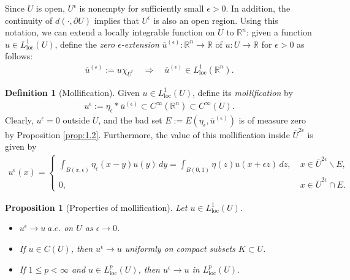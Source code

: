 \documentclass{article}
\numberwithin{equation}{section}
\newcommand{\bbR}{\mathbb{R}}
\newcommand{\loc}{\mathrm{loc}}
\theoremstyle{plain}
\newtheorem{proposition}[theorem]{Proposition}
\theoremstyle{definition}
\newtheorem{definition}[theorem]{Definition}
\begin{document}
Since $U$ is open, $U^\epsilon$ is nonempty for sufficiently small $\epsilon>0$. In addition, the continuity of $d(\cdot,\partial U)$ implies that $U^\epsilon$ is also an open region. Using this notation, we can extend a locally integrable function on $U$ to $\bbR^n$: given a function $u\in L^1_\loc(U)$, define the \textit{zero $\epsilon$-extension} $\overline{u}^{(\epsilon)}:\bbR^n\to\bbR$ of $u:U\to\bbR$ for $\epsilon>0$ as follows:
\begin{align*}
	\overline{u}^{(\epsilon)}:=u\chi_{\overline{U}^\epsilon}\quad\Rightarrow\quad \overline{u}^{(\epsilon)}\in L^1_\loc(\bbR^n).
\end{align*}

\begin{definition}[Mollification]\label{def:1.7}
Given $u\in L^1_\loc(U)$, define its \textit{mollification} by
\begin{align*}
	u^\epsilon := \eta_\epsilon * \overline{u}^{(\epsilon)}\subset C^\infty(\bbR^n)\subset C^\infty(U).
\end{align*}
Clearly, $u^\epsilon=0$ outside $U$, and the bad set $E:=E(\eta_\epsilon,\overline{u}^{(\epsilon)})$ is of measure zero by Proposition \ref{prop:1.2}. Furthermore, the value of this mollification inside $\overline{U}^{2\epsilon}$ is given by
\begin{align}
	u^\epsilon(x)=\begin{cases}
		\int_{B(x,\epsilon)}\eta_\epsilon(x-y)u(y)\,dy=\int_{B(0,1)}\eta(z)u(x+\epsilon z)\,dz,\ & x\in \overline{U}^{2\epsilon}\backslash E,\\
		0, & x\in \overline{U}^{2\epsilon}\cap E.
	\end{cases}\label{eq:1.6}
\end{align}
\end{definition}
\begin{proposition}[Properties of mollification]\label{prop:1.8}
Let $u\in L^1_\loc(U)$.
\begin{itemize}
	\item[(i)] $u^\epsilon\to u\ a.e.$ on $U$ as $\epsilon\to 0$.
	\item[(ii)] If $u\in C(U)$, then $u^\epsilon\to u$ uniformly on compact subsets $K\subset U$.
	\item[(iii)] If $1\leq p < \infty$ and $u\in L_\loc^p(U)$, then $u^\epsilon\to u$ in $L_\loc^p(U)$.
\end{itemize}	
\end{proposition}
\end{document}
